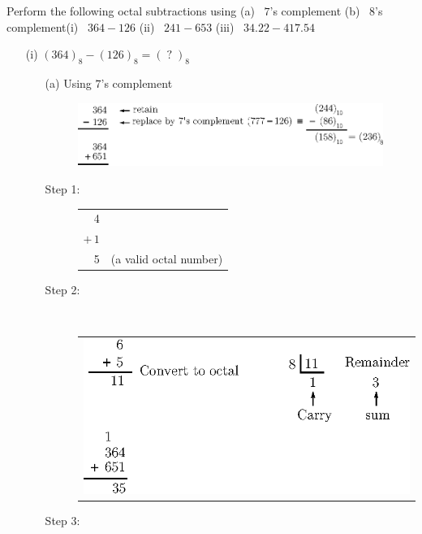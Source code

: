\eject

\begin{example}\label{exam6.21}
Perform the following octal subtractions using (a)~ $7$'s complement (b)~ $8$'s complement\quad (i)~ $364-126$ (ii)~ $241-653$ (iii)~ $34.22-417.54$
\end{example}

\begin{solution}
\begin{itemize}
\item[(i)] $(364)_{8}-(126)_{8}=(\;?\;)_{8}$
\begin{itemize}
\item[(a)] Using $7$'s complement
\begin{figure}[H]
\centering
\includegraphics{chap6/fig61.eps}
\end{figure}
\begin{description}
\item[Step 1:] \begin{tabular}[t]{rl}
4 & \\
$+\,1$ &\\
\cline{1-1}
 5 & (a valid octal number)
\end{tabular}

\item[Step 2:] 
~

\medskip

\begin{tabular}[c]{@{\qquad}r}
\includegraphics{chap6/fig62.eps}
\end{tabular}

\item[Step 3:] 
~


\end{description}
\end{itemize}
\end{itemize}
\end{solution}
